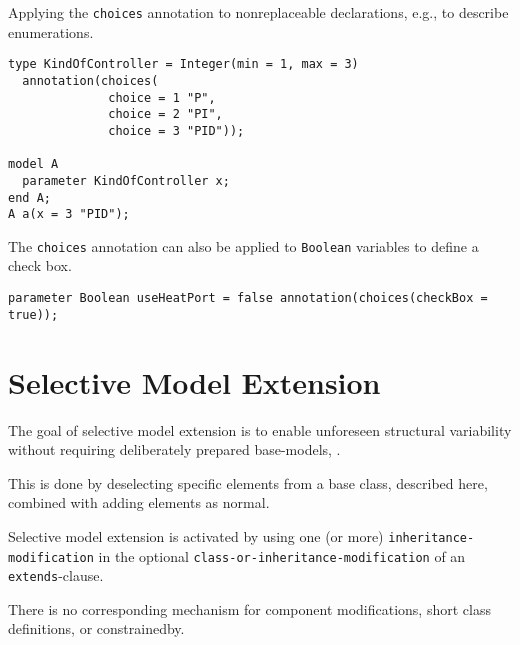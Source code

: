 \begin{example}
Applying the \lstinline!choices! annotation to nonreplaceable declarations, e.g., to describe enumerations.
\begin{lstlisting}[language=modelica]
type KindOfController = Integer(min = 1, max = 3)
  annotation(choices(
              choice = 1 "P",
              choice = 2 "PI",
              choice = 3 "PID"));

model A
  parameter KindOfController x;
end A;
A a(x = 3 "PID");
\end{lstlisting}

The \lstinline!choices! annotation can also be applied to \lstinline!Boolean! variables to define a check box.
\begin{lstlisting}[language=modelica]
parameter Boolean useHeatPort = false annotation(choices(checkBox = true));
\end{lstlisting}
\end{example}
\section{Selective Model Extension}\label{selective-model-extension}
\begin{nonnormative}
The goal of selective model extension is to enable unforeseen structural variability without requiring deliberately prepared base-models, \textcite{Buerger2019SelectiveModel}.

This is done by deselecting specific elements from a base class, described here, combined with adding elements as normal.
\end{nonnormative}
Selective model extension is activated by using one (or more) \lstinline[language=grammar]!inheritance-modification! in the optional \lstinline[language=grammar]!class-or-inheritance-modification! of an \lstinline!extends!-clause.
\begin{nonnormative}
There is no corresponding mechanism for component modifications, short class definitions, or constrainedby.
\end{nonnormative}

